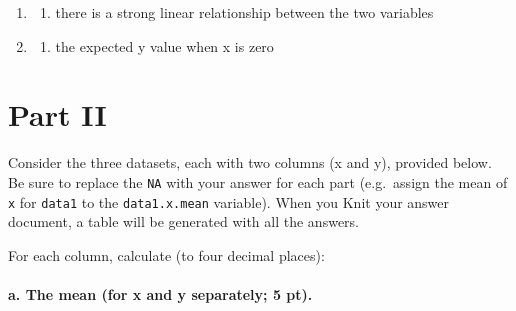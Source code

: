 \documentclass[
]{article}
\providecommand{\tightlist}{%
  \setlength{\itemsep}{0pt}\setlength{\parskip}{0pt}}
\begin{document}
\begin{enumerate}
\begin{enumerate}
  \end{enumerate}
\item
  \begin{enumerate}
  \def\labelenumii{\Alph{enumii})}
  \setcounter{enumii}{1}
  \tightlist
  \item
    there is a strong linear relationship between the two variables
  \end{enumerate}
\item
  \begin{enumerate}
  \def\labelenumii{\Alph{enumii})}
  \setcounter{enumii}{2}
  \tightlist
  \item
    the expected y value when x is zero
  \end{enumerate}
\end{enumerate}

\hypertarget{part-ii}{%
\section{Part II}\label{part-ii}}

Consider the three datasets, each with two columns (x and y), provided
below. Be sure to replace the \texttt{NA} with your answer for each part
(e.g.~assign the mean of \texttt{x} for \texttt{data1} to the
\texttt{data1.x.mean} variable). When you Knit your answer document, a
table will be generated with all the answers.

For each column, calculate (to four decimal places):

\hypertarget{a.-the-mean-for-x-and-y-separately-5-pt.}{%
\paragraph{a. The mean (for x and y separately; 5
pt).}\label{a.-the-mean-for-x-and-y-separately-5-pt.}}
\end{document}
